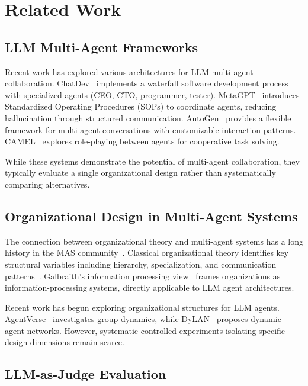 \documentclass[conference]{IEEEtran}
\begin{document}
\section{Related Work}
\label{sec:related}

\subsection{LLM Multi-Agent Frameworks}

Recent work has explored various architectures for LLM multi-agent collaboration.
ChatDev~\cite{qian2024chatdev} implements a waterfall software development process with specialized agents (CEO, CTO, programmer, tester).
MetaGPT~\cite{hong2023metagpt} introduces Standardized Operating Procedures (SOPs) to coordinate agents, reducing hallucination through structured communication.
AutoGen~\cite{wu2023autogen} provides a flexible framework for multi-agent conversations with customizable interaction patterns.
CAMEL~\cite{li2023camel} explores role-playing between agents for cooperative task solving.

While these systems demonstrate the potential of multi-agent collaboration, they typically evaluate a single organizational design rather than systematically comparing alternatives.

\subsection{Organizational Design in Multi-Agent Systems}

The connection between organizational theory and multi-agent systems has a long history in the MAS community~\cite{horling2004survey}.
Classical organizational theory identifies key structural variables including hierarchy, specialization, and communication patterns~\cite{mintzberg1979structuring}.
Galbraith's information processing view~\cite{galbraith1974designing} frames organizations as information-processing systems, directly applicable to LLM agent architectures.

Recent work has begun exploring organizational structures for LLM agents.
AgentVerse~\cite{chen2023agentverse} investigates group dynamics, while DyLAN~\cite{liu2023dynamic} proposes dynamic agent networks.
However, systematic controlled experiments isolating specific design dimensions remain scarce.

\subsection{LLM-as-Judge Evaluation}
\end{document}
